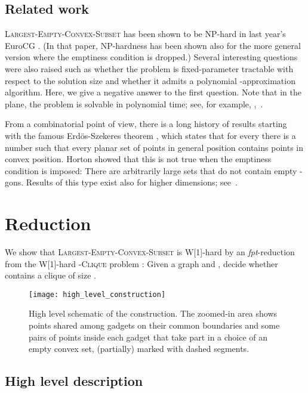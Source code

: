 \documentclass[11pt,a4paper]{article}
\begin{document}
\subsection{Related work}

\textsc{Largest-Empty-Convex-Subset} has been shown to be NP-hard in last year's EuroCG \cite{KW12}. (In that paper, NP-hardness has been shown also for the more general version where the emptiness condition is dropped.) Several interesting questions were also raised such as whether the problem is fixed-parameter tractable with respect to the solution size and whether it admits a polynomial -approximation algorithm. Here, we give a negative answer to the first question.
Note that in the plane, the problem is solvable in polynomial time; see, for example, \cite{AR85},~\cite{DEO90}.

From a combinatorial point of view, there is a long history of results starting with the famous Erd\"os-Szekeres theorem \cite{ES35}, which states that for every  there is a number  such that every planar set of  points in general position contains  points in convex position. Horton \cite{Ho83} showed that this is not true when the emptiness condition is imposed: There are arbitrarily large sets that do not contain empty -gons. Results of this type exist also for higher dimensions; see~\cite{MS00}.



\section{Reduction}
\label{sec:reduction}

We show that \textsc{Largest-Empty-Convex-Subset} is W[1]-hard by an \emph{fpt}-reduction from the W[1]-hard -\textsc{Clique} problem \cite{FG06}: Given a
graph  and , decide whether  contains a clique of size .

\begin{figure}
\centering
	\texttt{[image: high\_level\_construction]}
	\caption{High level schematic of the construction. The zoomed-in area shows points shared among gadgets on their common boundaries and some pairs of points inside each gadget that take part in a choice of an empty convex set, (partially) marked with dashed segments. }
	\label{fig:high_level_construction}
\end{figure}

\subsection{High level description}
\end{document}
